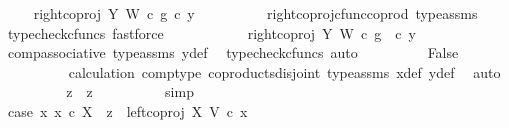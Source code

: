 \begin{isabellebody}
\ \isamarkupfalse%
\ {\isachardoublequoteopen}{\isachardot}{\kern0pt}{\isachardot}{\kern0pt}{\isachardot}{\kern0pt}\ {\isacharequal}{\kern0pt}\ {\isacharparenleft}{\kern0pt}right{\isacharunderscore}{\kern0pt}coproj\ Y\ W\ {\isasymcirc}\isactrlsub c\ g{\isacharparenright}{\kern0pt}\ {\isasymcirc}\isactrlsub c\ y{}{\isachardoublequoteclose}\isanewline
\ \ \ \ \ \ \ \ \isamarkupfalse%
\ right{\isacharunderscore}{\kern0pt}coproj{\isacharunderscore}{\kern0pt}cfunc{\isacharunderscore}{\kern0pt}coprod\ type{\isacharunderscore}{\kern0pt}assms\ \isamarkupfalse%
\ {\isacharparenleft}{\kern0pt}typecheck{\isacharunderscore}{\kern0pt}cfuncs{\isacharcomma}{\kern0pt}\ fastforce{\isacharparenright}{\kern0pt}\isanewline
\ \ \ \ \ \ \isamarkupfalse%
\ \isamarkupfalse%
\ {\isachardoublequoteopen}{\isachardot}{\kern0pt}{\isachardot}{\kern0pt}{\isachardot}{\kern0pt}\ {\isacharequal}{\kern0pt}\ right{\isacharunderscore}{\kern0pt}coproj\ Y\ W\ {\isasymcirc}\isactrlsub c\ g\ \ {\isasymcirc}\isactrlsub c\ y{}{\isachardoublequoteclose}\isanewline
\ \ \ \ \ \ \ \ \isamarkupfalse%
\ comp{\isacharunderscore}{\kern0pt}associative{}\ type{\isacharunderscore}{\kern0pt}assms{\isacharparenleft}{\kern0pt}{}{\isacharparenright}{\kern0pt}\ y{}{\isacharunderscore}{\kern0pt}def\ \isamarkupfalse%
\ {\isacharparenleft}{\kern0pt}typecheck{\isacharunderscore}{\kern0pt}cfuncs{\isacharcomma}{\kern0pt}\ auto{\isacharparenright}{\kern0pt}\isanewline
\ \ \ \ \ \ \isamarkupfalse%
\ \isamarkupfalse%
\ False\isanewline
\ \ \ \ \ \ \ \ \isamarkupfalse%
\ calculation\ comp{\isacharunderscore}{\kern0pt}type\ coproducts{\isacharunderscore}{\kern0pt}disjoint\ type{\isacharunderscore}{\kern0pt}assms\ x{}{\isacharunderscore}{\kern0pt}def\ y{}{\isacharunderscore}{\kern0pt}def\ \isamarkupfalse%
\ auto\isanewline
\ \ \ \ \ \ \isamarkupfalse%
\ \isamarkupfalse%
\ {\isachardoublequoteopen}z{}\ {\isacharequal}{\kern0pt}\ z{}{\isachardoublequoteclose}\isanewline
\ \ \ \ \ \ \ \ \isamarkupfalse%
\ simp\isanewline
\ \ \ \ \isamarkupfalse%
\isanewline
\ \ \isamarkupfalse%
\isanewline
\ \ \ \ \isamarkupfalse%
\ case{}{\isacharcolon}{\kern0pt}\ {\isachardoublequoteopen}{\isasymnexists}x{}{\isachardot}{\kern0pt}\ x{}\ {\isasymin}\isactrlsub c\ X\ {\isasymand}\ z{}\ {\isacharequal}{\kern0pt}\ left{\isacharunderscore}{\kern0pt}coproj\ X\ V\ {\isasymcirc}\isactrlsub c\ x{}{\isachardoublequoteclose}\isanewline

\end{isabellebody}
